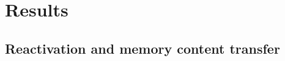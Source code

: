 \documentclass[10pt,letterpaper]{article}
\theoremstyle{plain}
\theoremstyle{remark}
\newcommand{\figplaceholder}[1]{\begin{center}\setlength{\fboxsep}{14pt}\fbox{\parbox{0.86\textwidth}{\centering\itshape [figure placeholder]\\ #1}}\end{center}}
\begin{document}



\section{Results}

\subsection{Reactivation and memory content transfer}
\end{document}
